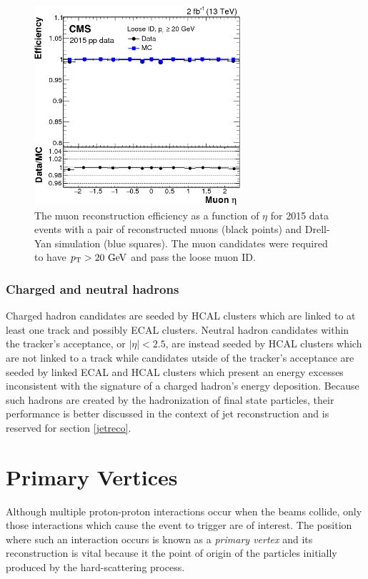 \begin{figure}[htbp]
  \centering
    \includegraphics[width=3in]{images/muonrecoeff}
    \caption[Muon Reconstruction Efficiency]{The muon reconstruction efficiency as a function of $\eta$ for 2015 data events with a pair of reconstructed muons (black points) and Drell-Yan simulation (blue squares). The muon candidates were required to have $p_{\mathrm{T}} > 20\ \mathrm{GeV}$ and pass the loose muon ID.\cite{CMSMUONPERF}}
    \label{fig:muonrecoperf}
\end{figure}

\subsubsection{Charged and neutral hadrons}

Charged hadron candidates are seeded by HCAL clusters which are linked to at least one track and possibly ECAL clusters. Neutral hadron candidates within the tracker's acceptance, or $\left| \eta \right| < 2.5$, are instead seeded by HCAL clusters which are not linked to a track while candidates utside of the tracker's acceptance are seeded by linked ECAL and HCAL clusters which present an energy excesses inconsistent with the signature of a charged hadron's energy deposition. Because such hadrons are created by the hadronization of final state particles, their performance is better discussed in the context of jet reconstruction and is reserved for section \ref{jetreco}.

\section{Primary Vertices}

Although multiple proton-proton interactions occur when the beams collide, only those interactions which cause the event to trigger are of interest. The position where such an interaction occurs is known as a \textit{primary vertex} and its reconstruction is vital because it the point of origin of the particles initially produced by the hard-scattering process.

